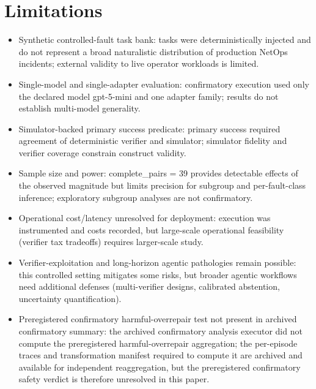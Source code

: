 \documentclass[conference]{IEEEtran}
\begin{document}
\section{Limitations}
\begin{itemize}
\item Synthetic controlled-fault task bank: tasks were deterministically injected and do not represent a broad naturalistic distribution of production NetOps incidents; external validity to live operator workloads is limited.
\item Single-model and single-adapter evaluation: confirmatory execution used only the declared model gpt-5-mini and one adapter family; results do not establish multi-model generality.
\item Simulator-backed primary success predicate: primary success required agreement of deterministic verifier and simulator; simulator fidelity and verifier coverage constrain construct validity.
\item Sample size and power: complete\_pairs = 39 provides detectable effects of the observed magnitude but limits precision for subgroup and per-fault-class inference; exploratory subgroup analyses are not confirmatory.
\item Operational cost/latency unresolved for deployment: execution was instrumented and costs recorded, but large-scale operational feasibility (verifier tax tradeoffs) requires larger-scale study.
\item Verifier-exploitation and long-horizon agentic pathologies remain possible: this controlled setting mitigates some risks, but broader agentic workflows need additional defenses (multi-verifier designs, calibrated abstention, uncertainty quantification).
\item Preregistered confirmatory harmful-overrepair test not present in archived confirmatory summary: the archived confirmatory analysis executor did not compute the preregistered harmful-overrepair aggregation; the per-episode traces and transformation manifest required to compute it are archived and available for independent reaggregation, but the preregistered confirmatory safety verdict is therefore unresolved in this paper.
\end{itemize}
\end{document}
